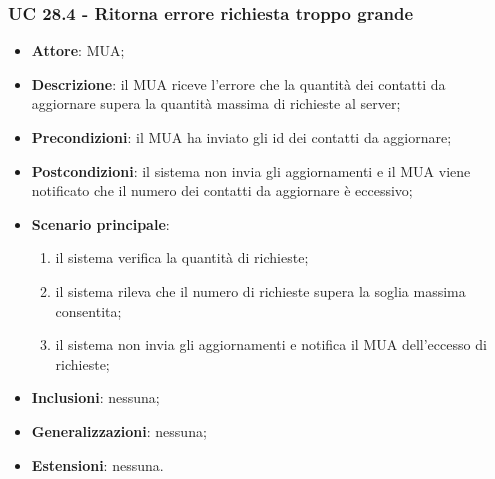     \subsubsection{UC 28.4 - Ritorna errore richiesta troppo grande} \label{sec:UC28.4}
    \begin{itemize}
        \item \textbf{Attore}: MUA;
        \item \textbf{Descrizione}: il MUA riceve l'errore che la quantità dei contatti da aggiornare supera la quantità massima di richieste al server;
        \item \textbf{Precondizioni}: il MUA ha inviato gli id dei contatti da aggiornare;
        \item \textbf{Postcondizioni}: il sistema non invia gli aggiornamenti e il MUA viene notificato che il numero dei contatti da aggiornare è eccessivo;
        \item \textbf{Scenario principale}:
            \begin{enumerate}
                \item il sistema verifica la quantità di richieste;
                \item il sistema rileva che il numero di richieste supera la soglia massima consentita;
                \item il sistema non invia gli aggiornamenti e notifica il MUA dell'eccesso di richieste;
            \end{enumerate}
        \item \textbf{Inclusioni}: nessuna;
        \item \textbf{Generalizzazioni}: nessuna;
        \item \textbf{Estensioni}: nessuna.
    \end{itemize}

